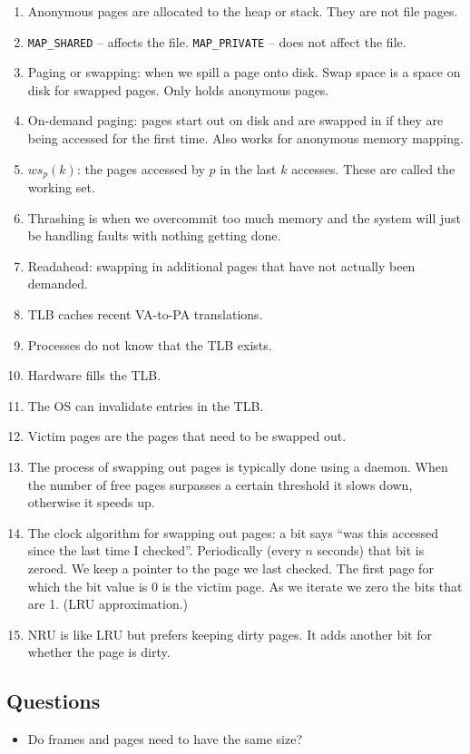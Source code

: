 \documentclass[12pt,a4paper]{article}
\newcommand{\tocsubsection}[1]{%
  \subsection*{#1}%
  \phantomsection
  \addcontentsline{toc}{subsection}{#1}%
}
\begin{document}
\begin{enumerate}
  \item Anonymous pages are allocated to the heap or stack. They are not file pages.
  \item \texttt{MAP\_SHARED} -- affects the file. \texttt{MAP\_PRIVATE} -- does not affect the file.
  \item Paging or swapping: when we spill a page onto disk. Swap space is a space on disk for swapped pages. Only holds anonymous pages.
  \item On-demand paging: pages start out on disk and are swapped in if they are being accessed for the first time. Also works for anonymous memory mapping.
  \item $ws_p(k)$: the pages accessed by $p$ in the last $k$ accesses. These are called the working set.
  \item Thrashing is when we overcommit too much memory and the system will just be handling faults with nothing getting done.
  \item Readahead: swapping in additional pages that have not actually been demanded.
  \item TLB caches recent VA-to-PA translations.
  \item Processes do not know that the TLB exists.
  \item Hardware fills the TLB.
  \item The OS can invalidate entries in the TLB.
  \item Victim pages are the pages that need to be swapped out.
  \item The process of swapping out pages is typically done using a daemon. When the number of free pages surpasses a certain threshold it slows down, otherwise it speeds up.
  \item The clock algorithm for swapping out pages: a bit says ``was this accessed since the last time I checked''. Periodically (every $n$ seconds) that bit is zeroed. We keep a pointer to the page we last checked. The first page for which the bit value is 0 is the victim page. As we iterate we zero the bits that are 1. (LRU approximation.)
  \item NRU is like LRU but prefers keeping dirty pages. It adds another bit for whether the page is dirty.
\end{enumerate}

\tocsubsection{Questions}

\begin{itemize}
  \item Do frames and pages need to have the same size?
\end{itemize}
\end{document}

